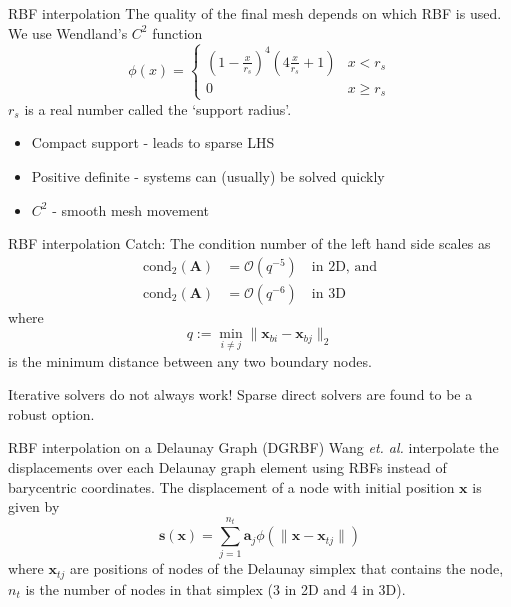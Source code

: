 \documentclass[t,12pt]{beamer}
\let\bld\boldsymbol
\begin{document}
\begin{frame}{RBF interpolation}
The quality of the final mesh depends on which RBF is used. We use Wendland's $C^2$ function 
\begin{equation}
\phi(x) = 
\begin{cases}
\left(1-\frac{x}{r_s}\right)^4\left(4\frac{x}{r_s} + 1\right) & x < r_s \\
0 & x \geq r_s
\end{cases}
\end{equation}
$r_s$ is a real number called the `support radius'.
\begin{itemize}
	\item Compact support - leads to sparse LHS
	\item Positive definite - systems can (usually) be solved quickly
	\item $C^2$ - smooth mesh movement
\end{itemize}
\end{frame}

\begin{frame}{RBF interpolation}
Catch: The condition number of the left hand side scales as
\begin{equation}
\begin{aligned}
\text{cond}_2 (\bld{A}) &= \mathcal{O}(q^{-5}) \quad \text{in 2D, and} \\
\text{cond}_2 (\bld{A}) &= \mathcal{O}(q^{-6}) \quad \text{in 3D}
\end{aligned}
\end{equation}
where
\begin{equation}
q := \min_{i\neq j} \lVert \bld{x}_{bi} - \bld{x}_{bj} \rVert_2
\end{equation}
is the minimum distance between any two boundary nodes.

Iterative solvers do not always work! Sparse direct solvers are found to be a robust option.
\end{frame}

\begin{frame}{RBF interpolation on a Delaunay Graph (DGRBF)}
Wang \emph{et. al.}  interpolate the displacements over each Delaunay graph element  using RBFs instead of barycentric coordinates.
The displacement of a node with initial position $\bld{x}$ is given by
\begin{equation}
\mathbf{s}(\mathbf{x}) = \sum_{j=1}^{n_t} \mathbf{a}_j \phi(\lVert\mathbf{x} - \mathbf{x}_{tj}\rVert)
\label{eqn:dgrbf}
\end{equation}
where $\bld{x}_{tj}$ are positions of nodes of the Delaunay simplex that contains the node, $n_t$ is the number of nodes in that simplex (3 in 2D and 4 in 3D). 
\end{frame}
\end{document}
